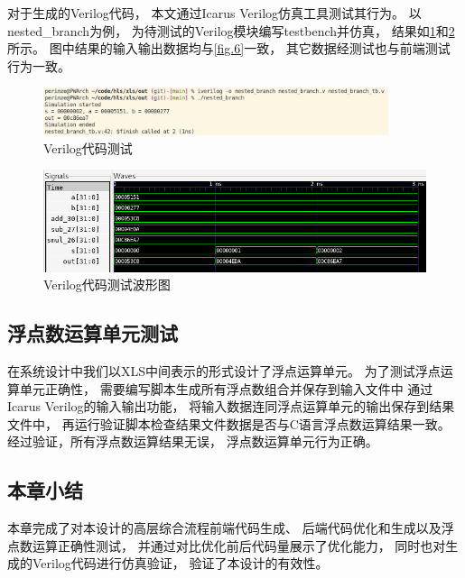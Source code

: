 对于生成的Verilog代码，
本文通过Icarus Verilog仿真工具测试其行为。
以nested\_branch为例，
为待测试的Verilog模块编写testbench并仿真，
结果如\ref{fig.12}和\ref{fig.13}所示。
图中结果的输入输出数据均与\ref{fig.6}一致，
其它数据经测试也与前端测试行为一致。

\begin{figure}[h]
\centering
\includegraphics[width=0.9\textwidth]{figure/verilog_test.png}
\caption{Verilog代码测试}
\label{fig.12}
\end{figure}

\begin{figure}[h]
\centering
\includegraphics{figure/wave.png}
\caption{Verilog代码测试波形图}
\label{fig.13}
\end{figure}

\pagebreak

\subsection{浮点数运算单元测试}

在系统设计中我们以XLS中间表示的形式设计了浮点运算单元。
为了测试浮点运算单元正确性，
需要编写脚本生成所有浮点数组合并保存到输入文件中
通过Icarus Verilog的输入输出功能，
将输入数据连同浮点运算单元的输出保存到结果文件中，
再运行验证脚本检查结果文件数据是否与C语言浮点数运算结果一致。
经过验证，所有浮点数运算结果无误，
浮点数运算单元行为正确。

\subsection{本章小结}

本章完成了对本设计的高层综合流程前端代码生成、
后端代码优化和生成以及浮点数运算正确性测试，
并通过对比优化前后代码量展示了优化能力，
同时也对生成的Verilog代码进行仿真验证，
验证了本设计的有效性。